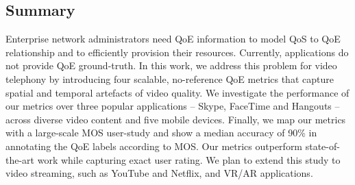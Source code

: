 \subsection{Summary}
Enterprise network administrators need QoE information to model QoS to QoE relationship and to efficiently provision their resources. Currently, applications do not provide QoE ground-truth. In this work, we address this problem for video telephony by introducing four scalable, no-reference QoE metrics that capture spatial and temporal artefacts of video quality. We investigate the performance of our metrics over three popular applications -- Skype, FaceTime and Hangouts -- across diverse video content and five mobile devices. Finally, we map our metrics with a large-scale MOS user-study and show a median accuracy of 90\% in annotating the QoE labels according to MOS. Our metrics outperform state-of-the-art work while capturing exact user rating. We plan to extend this study to video streaming, such as YouTube and Netflix, and VR/AR applications.
